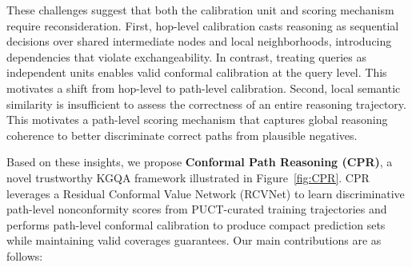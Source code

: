 \documentclass{article}
\newcommand{\jy}[1]{\textcolor{red}{[JY: #1]}}
\theoremstyle{plain}
\theoremstyle{definition}
\theoremstyle{remark}
\begin{document}

These challenges suggest that both the calibration unit and scoring mechanism require reconsideration. First, hop-level calibration casts reasoning as sequential decisions over shared intermediate nodes and local neighborhoods, introducing dependencies that violate exchangeability. In contrast, treating queries as independent units enables valid conformal calibration at the query level. This motivates a shift from hop-level to path-level calibration. Second, local semantic similarity is insufficient to assess the correctness of an entire reasoning trajectory. This motivates a path-level scoring mechanism that captures global reasoning coherence to better discriminate correct paths from plausible negatives.

Based on these insights, we propose \textbf{Conformal Path Reasoning (CPR)}, a novel trustworthy KGQA framework illustrated in Figure~\ref{fig:CPR}. CPR leverages a Residual Conformal Value Network (RCVNet) to learn discriminative path-level nonconformity scores from PUCT-curated training trajectories and performs path-level conformal calibration to produce compact prediction sets while maintaining valid coverages guarantees.
Our main contributions are as follows:
\end{document}
